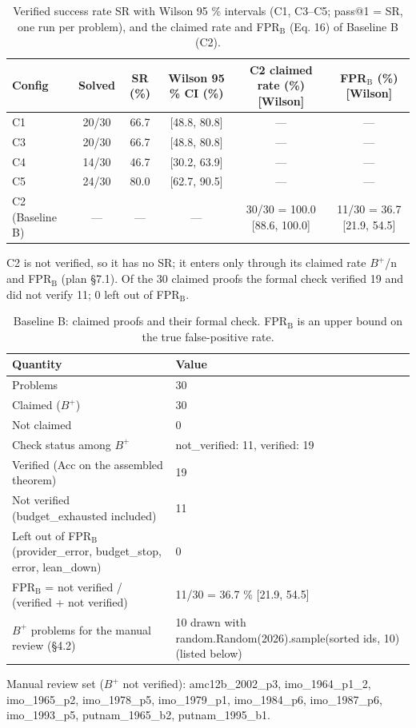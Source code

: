 \begin{table}[t]
\centering
\scriptsize
\setlength{\tabcolsep}{3pt}
\caption{Verified success rate SR with Wilson 95 \% intervals (C1, C3--C5; pass@1 = SR, one run per problem), and the claimed rate and FPR$_{\mathrm{B}}$ (Eq. 16) of Baseline B (C2).}
\label{tab:sr}
\begin{tabular}{lccccc}
\toprule
Config & Solved & SR (\%) & Wilson 95 \% CI (\%) & C2 claimed rate (\%) {[}Wilson{]} & FPR$_{\mathrm{B}}$ (\%) {[}Wilson{]} \\
\midrule
C1 & 20/30 & 66.7 & {[}48.8, 80.8{]} & --- & --- \\
C3 & 20/30 & 66.7 & {[}48.8, 80.8{]} & --- & --- \\
C4 & 14/30 & 46.7 & {[}30.2, 63.9{]} & --- & --- \\
C5 & 24/30 & 80.0 & {[}62.7, 90.5{]} & --- & --- \\
C2 (Baseline B) & --- & --- & --- & 30/30 = 100.0 {[}88.6, 100.0{]} & 11/30 = 36.7 {[}21.9, 54.5{]} \\
\bottomrule
\end{tabular}

\vspace{2pt}
\parbox{\linewidth}{\scriptsize C2 is not verified, so it has no SR; it enters only through its claimed rate $B^{+}$/n and FPR$_{\mathrm{B}}$ (plan §7.1). Of the 30 claimed proofs the formal check verified 19 and did not verify 11; 0 left out of FPR$_{\mathrm{B}}$.}
\end{table}

\begin{table}[t]
\centering
\scriptsize
\setlength{\tabcolsep}{3pt}
\caption{Baseline B: claimed proofs and their formal check. FPR$_{\mathrm{B}}$ is an upper bound on the true false-positive rate.}
\label{tab:fprb}
\begin{tabular}{ll}
\toprule
Quantity & Value \\
\midrule
Problems & 30 \\
Claimed ($B^{+}$) & 30 \\
Not claimed & 0 \\
Check status among $B^{+}$ & not\_verified: 11, verified: 19 \\
Verified (Acc on the assembled theorem) & 19 \\
Not verified (budget\_exhausted included) & 11 \\
Left out of FPR$_{\mathrm{B}}$ (provider\_error, budget\_stop, error, lean\_down) & 0 \\
FPR$_{\mathrm{B}}$ = not verified / (verified + not verified) & 11/30 = 36.7 \% {[}21.9, 54.5{]} \\
$B^{+}$ problems for the manual review (§4.2) & 10 drawn with random.Random(2026).sample(sorted ids, 10) (listed below) \\
\bottomrule
\end{tabular}

\vspace{2pt}
\parbox{\linewidth}{\scriptsize Manual review set ($B^{+}$ not verified): amc12b\_2002\_p3, imo\_1964\_p1\_2, imo\_1965\_p2, imo\_1978\_p5, imo\_1979\_p1, imo\_1984\_p6, imo\_1987\_p6, imo\_1993\_p5, putnam\_1965\_b2, putnam\_1995\_b1.}
\end{table}

